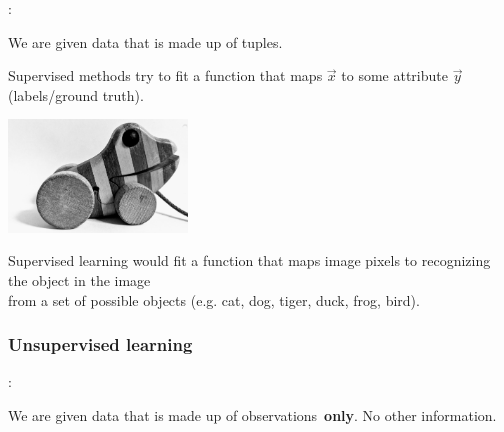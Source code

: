 \begin{frame}{\subsecname:~\subsubsecname}

We are given data that is made up of tuples.

Supervised methods try to fit a function that maps $\vec x$ to some attribute $\vec y$ (labels/ground truth).

\begin{center}
	\includegraphics[height=3cm]{img/tigerente}
\end{center}

Supervised learning would fit a function that maps image pixels to recognizing the object in the image\\
from a set of possible objects (e.g. cat, dog, tiger, duck, frog, bird).
    
\end{frame}

\subsubsection{Unsupervised learning}

\begin{frame}{\subsecname: \subsubsecname}

We are given data that is made up of observations\pause~\textbf{only}. No other information.


\end{frame}

